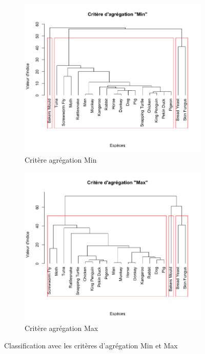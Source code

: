 \documentclass[a4paper,10pt]{report}
\begin{document}
\begin{figure}[H]
	\centering
	\captionsetup{justification=centering, margin=3cm}
	\begin{subfigure}[b]{0.4\linewidth}
		\centering
		\captionsetup{justification=centering}
		\includegraphics[width=1\linewidth]{img/2-1-mut-hierarchie-min}
		\caption{\scriptsize Critère agrégation Min}
		\label{fig:2-1-mut-hierarchie-min}
	\end{subfigure}%
	\begin{subfigure}[b]{0.4\linewidth}
		\centering
		\captionsetup{justification=centering}
		\includegraphics[width=1\linewidth]{img/2-1-mut-hierarchie-max}
		\caption{\scriptsize Critère agrégation Max}
		\label{fig:2-1-mut-hierarchie-max}
	\end{subfigure}%
	\caption{\small Classification avec les critères d'agrégation Min et Max}
	\label{fig:2-1-classification-mut-min-max}%
\end{figure}
\end{document}
